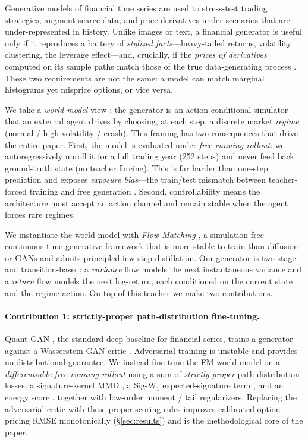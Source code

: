 \documentclass[11pt]{article}
\begin{document}
Generative models of financial time series are used to stress-test trading
strategies, augment scarce data, and price derivatives under scenarios that are
under-represented in history. Unlike images or text, a financial generator is
useful only if it reproduces a battery of \emph{stylized facts}---heavy-tailed
returns, volatility clustering, the leverage effect---and, crucially, if the
\emph{prices of derivatives} computed on its sample paths match those of the true
data-generating process \citep{cont2001empirical}. These two requirements are not
the same: a model can match marginal histograms yet misprice options, or vice
versa.

We take a \emph{world-model} view \citep{ha2018world,alonso2024diamond}: the
generator is an action-conditional simulator that an external agent drives by
choosing, at each step, a discrete market \emph{regime} (normal / high-volatility
/ crash). This framing has two consequences that drive the entire paper. First,
the model is evaluated under \emph{free-running rollout}: we autoregressively
unroll it for a full trading year (252 steps) and never feed back ground-truth
state (no teacher forcing). This is far harder than one-step prediction and
exposes \emph{exposure bias}---the train/test mismatch between teacher-forced
training and free generation \citep{bengio2015scheduled}. Second, controllability
means the architecture must accept an action channel and remain stable when the
agent forces rare regimes.

We instantiate the world model with \emph{Flow Matching}
\citep{lipman2023flow,liu2023rectified,albergo2023stochastic}, a simulation-free
continuous-time generative framework that is more stable to train than diffusion
or GANs and admits principled few-step distillation. Our generator is two-stage
and transition-based: a \emph{variance} flow models the next instantaneous
variance and a \emph{return} flow models the next log-return, each conditioned on
the current state and the regime action. On top of this teacher we make two
contributions.

\paragraph{Contribution 1: strictly-proper path-distribution fine-tuning.}
Quant-GAN \citep{wiese2020quant}, the standard deep baseline for financial series,
trains a generator against a Wasserstein-GAN critic
\citep{gulrajani2017improved}. Adversarial training is unstable and provides no
distributional guarantee. We instead fine-tune the FM world model on a
\emph{differentiable free-running rollout} using a sum of \emph{strictly-proper}
\citep{gneiting2007strictly} path-distribution losses: a signature-kernel MMD
\citep{salvi2021signature,issa2023nonadversarial,gretton2012kernel}, a Sig-W$_1$
expected-signature term \citep{ni2021sigwgan,ni2020conditional}, and an energy
score \citep{pacchiardi2024probabilistic}, together with low-order moment / tail
regularizers. Replacing the adversarial critic with these proper scoring rules
improves calibrated option-pricing RMSE monotonically (\S\ref{sec:results}) and is
the methodological core of the paper.
\end{document}
